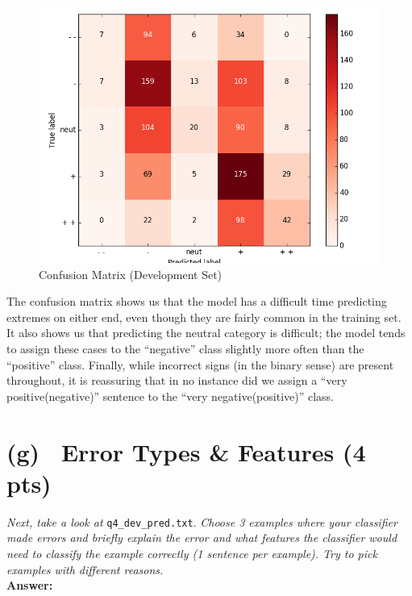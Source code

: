 \documentclass[fleqn]{MJD}
\newcommand{\subproblem}[2]{\section{(#1)~ #2}}
\newcommand{\0}{\emptyset}
\begin{document}
\begin{figure}[!htbp]\centering
	\label{figure:confusionmatrix}
	\caption{Confusion Matrix (Development Set)}
	\includegraphics[scale=0.7]{q4_dev_conf.png}
\end{figure}

\noindent The confusion matrix shows us that the model has a difficult time predicting extremes on either end, even though they are fairly common in the training set. It also shows us that predicting the neutral category is difficult; the model tends to assign these cases to the ``negative'' class slightly more often than the ``positive'' class. Finally, while incorrect signs (in the binary sense) are present throughout, it is reassuring that in no instance did we assign a ``very positive(negative)'' sentence to the ``very negative(positive)'' class. \\



\newpage 

\subproblem{g}{Error Types \& Features (4 pts)}
\textit{Next, take a look at} \verb|q4_dev_pred.txt|. \textit{Choose 3 examples where your classifier made errors
and briefly explain the error and what features the classifier would need to classify the example correctly
(1 sentence per example). Try to pick examples with different reasons.} \\


\noindent \textbf{Answer:} \\
\end{document}
